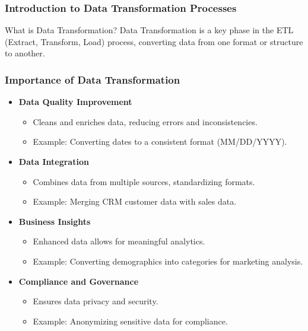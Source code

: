 \documentclass[aspectratio=169]{beamer}
\begin{document}
\frame{\titlepage}

\begin{frame}[fragile]
    \frametitle{Introduction to Data Transformation Processes}
    \begin{block}{What is Data Transformation?}
        Data Transformation is a key phase in the ETL (Extract, Transform, Load) process, converting data from one format or structure to another.
    \end{block}
\end{frame}

\begin{frame}[fragile]
    \frametitle{Importance of Data Transformation}
    \begin{itemize}
        \item \textbf{Data Quality Improvement}
            \begin{itemize}
                \item Cleans and enriches data, reducing errors and inconsistencies.
                \item Example: Converting dates to a consistent format (MM/DD/YYYY).
            \end{itemize}
        \item \textbf{Data Integration}
            \begin{itemize}
                \item Combines data from multiple sources, standardizing formats.
                \item Example: Merging CRM customer data with sales data.
            \end{itemize}
        \item \textbf{Business Insights}
            \begin{itemize}
                \item Enhanced data allows for meaningful analytics.
                \item Example: Converting demographics into categories for marketing analysis.
            \end{itemize}
        \item \textbf{Compliance and Governance}
            \begin{itemize}
                \item Ensures data privacy and security.
                \item Example: Anonymizing sensitive data for compliance.
            \end{itemize}
    \end{itemize}
\end{frame}
\end{document}
